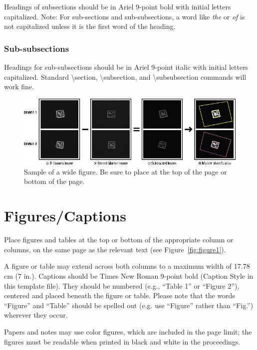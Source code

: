 \documentclass{scsSimAUDPaperFormat}
\begin{document}
Headings of subsections should be in Ariel 9-point bold with
initial letters capitalized. Note: For sub-sections and sub-subsections, a word like \emph{the} or \emph{of} is not capitalized unless it is the first word of the heading.

\subsubsection{Sub-subsections}

Headings for sub-subsections should be in Ariel 9-point italic
with initial letters capitalized. Standard {\textbackslash}section,
{\textbackslash}subsection, and {\textbackslash}subsubsection commands
will work fine.

\begin{figure}[ht!]
	\centering
	\includegraphics[width=1.0\textwidth]{Figure2}
	\centering
	\caption{Sample of a wide figure. Be sure to place at the top of the page or bottom of the page.}
	\centering
	\label{fig:figure2}
\end{figure}

\section{Figures/Captions}

Place figures and tables at the top or bottom of the appropriate column or columns, on the same page as the relevant text (see Figure~\ref{fig:figure1}). 

A figure or table may extend across both columns to a maximum width of 17.78 cm (7 in.). Captions should be Times New Roman 9-point bold (Caption Style in this template file). They should be numbered (e.g., “Table 1” or “Figure 2”), centered and placed beneath the figure or table. Please note that the words “Figure” and “Table” should be spelled out (e.g. use “Figure” rather than “Fig.”) wherever they occur. 

Papers and notes may use color figures, which are included in the page limit; the figures must be readable when printed in black and white in the proceedings.
\end{document}
